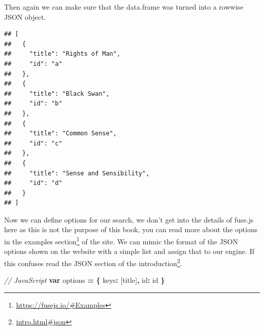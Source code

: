 \documentclass[
]{krantz}
\makeatletter
\newenvironment{Shaded}{\begin{snugshade}}{\end{snugshade}}
\newcommand{\CommentTok}[1]{\textcolor[rgb]{0.37,0.37,0.37}{\textit{#1}}}
\newcommand{\DataTypeTok}[1]{\textcolor[rgb]{0.27,0.27,0.27}{#1}}
\newcommand{\KeywordTok}[1]{\textcolor[rgb]{0.27,0.27,0.27}{\textbf{#1}}}
\newcommand{\NormalTok}[1]{#1}
\newcommand{\OperatorTok}[1]{\textcolor[rgb]{0.43,0.43,0.43}{\textbf{#1}}}
\newcommand{\StringTok}[1]{\textcolor[rgb]{0.5,0.5,0.5}{#1}}
\renewcommand{\href}[2]{#2\footnote{\url{#1}}}
\newenvironment{kframe}{%
\medskip{}
\setlength{\fboxsep}{.8em}
 \def\at@end@of@kframe{}%
 \ifinner\ifhmode%
  \def\at@end@of@kframe{\end{minipage}}%
  \begin{minipage}{\columnwidth}%
 \fi\fi%
 \def\FrameCommand##1{\hskip\@totalleftmargin \hskip-\fboxsep
 \colorbox{shadecolor}{##1}\hskip-\fboxsep
     \hskip-\linewidth \hskip-\@totalleftmargin \hskip\columnwidth}%
 \MakeFramed {\advance\hsize-\width
   \@totalleftmargin\z@ \linewidth\hsize
   \@setminipage}}%
 {\par\unskip\endMakeFramed%
 \at@end@of@kframe}
\renewenvironment{Shaded}{\begin{kframe}}{\end{kframe}}
\makeatother
\begin{document}
\begin{Shaded}
\end{Shaded}

Then again we can make sure that the data.frame was turned into a rowwise JSON object.

\begin{Shaded}
\end{Shaded}

\begin{verbatim}
## [
##   {
##     "title": "Rights of Man",
##     "id": "a"
##   },
##   {
##     "title": "Black Swan",
##     "id": "b"
##   },
##   {
##     "title": "Common Sense",
##     "id": "c"
##   },
##   {
##     "title": "Sense and Sensibility",
##     "id": "d"
##   }
## ]
\end{verbatim}

Now we can define options for our search, we don't get into the details of fuse.js here as this is not the purpose of this book, you can read more about the options in the \href{https://fusejs.io/\#Examples}{examples section} of the site. We can mimic the format of the JSON options shown on the website with a simple list and assign that to our engine. If this confuses read the \href{intro.html\#json}{JSON section of the introduction}.

\begin{Shaded}
\begin{Highlighting}[]
\CommentTok{// JavaScript}
\KeywordTok{var}\NormalTok{ options }\OperatorTok{=} \OperatorTok{\{}
  \DataTypeTok{keys}\OperatorTok{:}\NormalTok{ [}\StringTok{\textquotesingle{}title\textquotesingle{}}\NormalTok{]}\OperatorTok{,}
  \DataTypeTok{id}\OperatorTok{:} \StringTok{\textquotesingle{}id\textquotesingle{}}
\OperatorTok{\}}
\end{Highlighting}
\end{Shaded}
\end{document}
